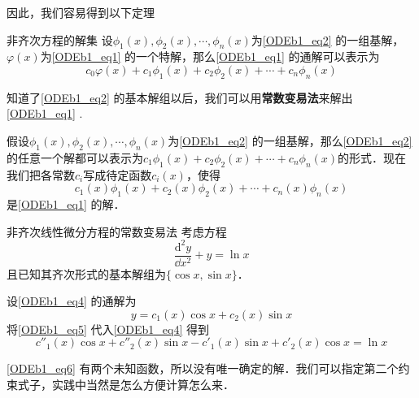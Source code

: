 因此，我们容易得到以下定理
\begin{theorem}{非齐次方程的解集}
设$\phi_1(x), \phi_2(x), \cdots, \phi_n(x)$为\autoref{ODEb1_eq2} 的一组基解，$\varphi(x)$为\autoref{ODEb1_eq1} 的一个特解，那么\autoref{ODEb1_eq1} 的通解可以表示为
\begin{equation}
c_0\varphi(x)+c_1\phi_1(x)+c_2\phi_2(x)+\cdots+c_n\phi_n(x)
\end{equation}
\end{theorem}

知道了\autoref{ODEb1_eq2} 的基本解组以后，我们可以用\textbf{常数变易法}来解出\autoref{ODEb1_eq1} .

假设$\phi_1(x), \phi_2(x), \cdots, \phi_n(x)$为\autoref{ODEb1_eq2} 的一组基解，那么\autoref{ODEb1_eq2} 的任意一个解都可以表示为$c_1\phi_1(x)+c_2\phi_2(x)+\cdots+c_n\phi_n(x)$的形式．现在我们把各常数$c_i$写成待定函数$c_i(x)$，使得
\begin{equation}
c_1(x)\phi_1(x)+c_2(x)\phi_2(x)+\cdots+c_n(x)\phi_n(x)
\end{equation}
是\autoref{ODEb1_eq1} 的解．

\begin{example}{非齐次线性微分方程的常数变易法}
考虑方程
\begin{equation}\label{ODEb1_eq4}
\frac{\mathrm{d}^2 y}{\dd x^2}+y=\ln x
\end{equation}
且已知其齐次形式的基本解组为$\{\cos x, \sin x\}$．

设\autoref{ODEb1_eq4} 的通解为
\begin{equation}\label{ODEb1_eq5}
y=c_1(x)\cos x+c_2(x)\sin x
\end{equation}
将\autoref{ODEb1_eq5} 代入\autoref{ODEb1_eq4} 得到
\begin{equation}\label{ODEb1_eq6}
c''_1(x)\cos x+c''_2(x)\sin x-c'_1(x)\sin x+c'_2(x)\cos x=\ln x
\end{equation}

\autoref{ODEb1_eq6} 有两个未知函数，所以没有唯一确定的解．我们可以指定第二个约束式子，实践中当然是怎么方便计算怎么来．





\end{example}



















